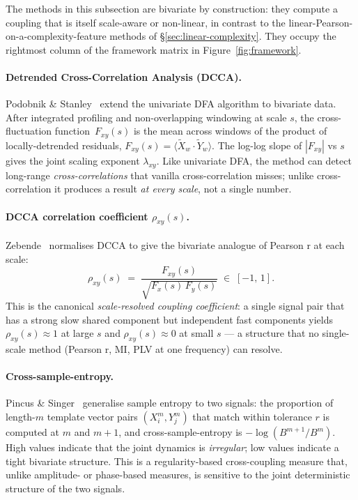 \documentclass[11pt,a4paper]{article}
\begin{document}
The methods in this subsection are bivariate by construction: they
compute a coupling that is itself scale-aware or non-linear, in
contrast to the linear-Pearson-on-a-complexity-feature methods of
\S\ref{sec:linear-complexity}. They occupy the rightmost column of
the framework matrix in Figure~\ref{fig:framework}.

\paragraph{Detrended Cross-Correlation Analysis (DCCA).}
Podobnik \& Stanley~\cite{Podobnik2008} extend the univariate DFA
algorithm to bivariate data. After integrated profiling and
non-overlapping windowing at scale $s$, the cross-fluctuation
function~$F_{xy}(s)$ is the mean across windows of the product of
locally-detrended residuals,
\(F_{xy}(s) = \langle \tilde X_w \cdot \tilde Y_w \rangle\). The
log-log slope of $|F_{xy}|$ vs $s$ gives the joint scaling exponent
$\lambda_{xy}$. Like univariate DFA, the method can detect
long-range \emph{cross-correlations} that vanilla cross-correlation
misses; unlike cross-correlation it produces a result \emph{at every
scale}, not a single number.

\paragraph{DCCA correlation coefficient $\rho_{xy}(s)$.}
Zebende~\cite{Zebende2011} normalises DCCA to give the bivariate
analogue of Pearson r at each scale:
\begin{equation}
\rho_{xy}(s) \;=\; \frac{F_{xy}(s)}{\sqrt{F_x(s)\,F_y(s)}}
\;\in\; [-1,\, 1].
\end{equation}
This is the canonical \emph{scale-resolved coupling coefficient}: a
single signal pair that has a strong slow shared component but
independent fast components yields $\rho_{xy}(s) \approx 1$ at large $s$
and $\rho_{xy}(s) \approx 0$ at small $s$ --- a structure that no
single-scale method (Pearson r, MI, PLV at one frequency) can resolve.

\paragraph{Cross-sample-entropy.}
Pincus \& Singer~\cite{Pincus1996} generalise sample entropy to two
signals: the proportion of length-$m$ template vector pairs
$(X^m_i, Y^m_j)$ that match within tolerance $r$ is computed at $m$ and
$m\!+\!1$, and cross-sample-entropy is
$-\log(B^{m+1}/B^m)$. High values indicate that the joint dynamics is
\emph{irregular}; low values indicate a tight bivariate structure.
This is a regularity-based cross-coupling measure that, unlike
amplitude- or phase-based measures, is sensitive to the joint
deterministic structure of the two signals.
\end{document}
